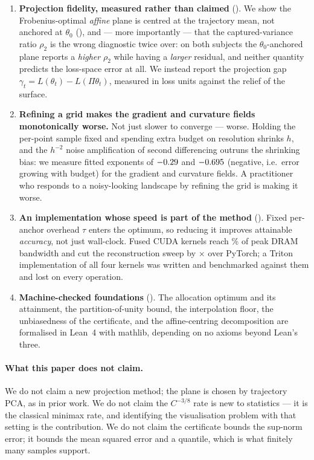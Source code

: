 \documentclass[11pt]{article}
\theoremstyle{definition}
\begin{document}
\begin{enumerate}[leftmargin=1.4em,itemsep=2pt]
\item \textbf{Projection fidelity, measured rather than claimed} (). We
show the Frobenius-optimal \emph{affine} plane is centred at the trajectory mean, not
anchored at $\theta_0$ (), and --- more importantly --- that the
captured-variance ratio $\rho_2$ is the wrong diagnostic twice over: on both subjects
the $\theta_0$-anchored plane reports a \emph{higher} $\rho_2$ while having a
\emph{larger} residual, and neither quantity predicts the loss-space error at all. We
instead report the projection gap $\gamma_t=L(\theta_t)-L(\Pi\theta_t)$, measured in
loss units against the relief of the surface.

\item \textbf{Refining a grid makes the gradient and curvature fields monotonically
worse.} Not just slower to converge --- worse. Holding the per-point sample fixed and
spending extra budget on resolution shrinks $h$, and the $h^{-2}$ noise amplification of
second differencing outruns the shrinking bias: we measure fitted exponents of
$-0.29$ and $-0.695$ (negative, i.e.\ error growing with budget) for the
gradient and curvature fields. A practitioner who responds to a noisy-looking landscape
by refining the grid is making it worse.

\item \textbf{An implementation whose speed is part of the method}
(). Fixed per-anchor overhead $\tau$ enters the optimum, so reducing
it improves attainable \emph{accuracy}, not just wall-clock. Fused CUDA kernels reach
\CNNbandwidth\% of peak DRAM bandwidth and cut the reconstruction sweep by
\PUspeedup$\times$ over PyTorch; a Triton implementation of all four kernels was written
and benchmarked against them and lost on every operation.

\item \textbf{Machine-checked foundations} (). The allocation optimum and
its attainment, the partition-of-unity bound, the interpolation floor, the
unbiasedness of the certificate, and the affine-centring decomposition are formalised in
Lean~4 with mathlib, depending on no axioms beyond Lean's three.
\end{enumerate}

\paragraph{What this paper does not claim.} We do not claim a new projection method; the
plane is chosen by trajectory PCA, as in prior work. We do not claim the $C^{-3/8}$ rate
is new to statistics --- it is the classical minimax rate, and identifying the
visualisation problem with that setting is the contribution. We do not claim the
certificate bounds the sup-norm error; it bounds the mean squared error and a quantile,
which is what finitely many samples support.
\end{document}

